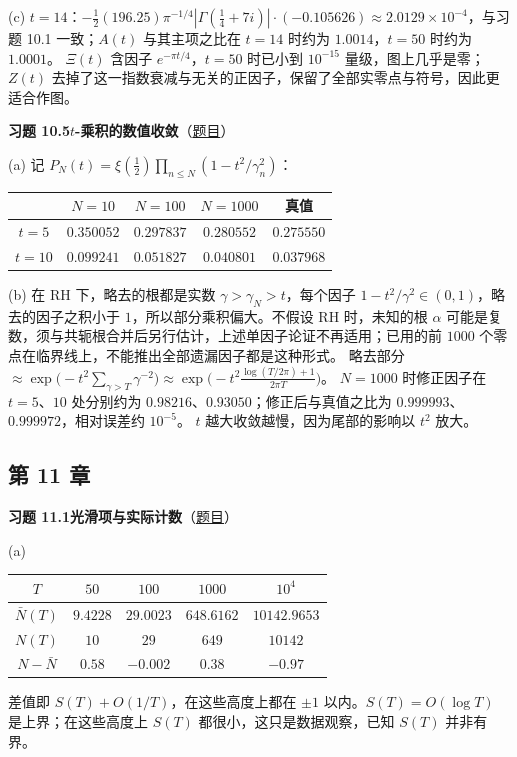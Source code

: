 \documentclass[11pt,a4paper]{article}
\newcommand{\Sol}[2]{%
  \par\addvspace{1.2em}\noindent
  \hypertarget{s:#1}{}\textbf{习题 #1\quad #2}\hfill{\small（\hyperlink{q:#1}{题目}）}\par
  \nopagebreak\smallskip}
\begin{document}
(c) $t=14$：$-\frac12(196.25)\pi^{-1/4}|\Gamma(\frac14+7i)|\cdot(-0.105626)\approx2.0129\times10^{-4}$，与习题 10.1 一致；$A(t)$ 与其主项之比在 $t=14$ 时约为 $1.0014$，$t=50$ 时约为 $1.0001$。
$\Xi(t)$ 含因子 $e^{-\pi t/4}$，$t=50$ 时已小到 $10^{-15}$ 量级，图上几乎是零；$Z(t)$ 去掉了这一指数衰减与无关的正因子，保留了全部实零点与符号，因此更适合作图。

\Sol{10.5}{$t$-乘积的数值收敛}
(a) 记 $P_N(t)=\xi(\frac12)\prod_{n\le N}(1-t^2/\gamma_n^2)$：
\begin{center}
\small
\begin{tabular}{@{}ccccc@{}}
\toprule
 & $N=10$ & $N=100$ & $N=1000$ & 真值 \\
\midrule
$t=5$ & $0.350052$ & $0.297837$ & $0.280552$ & $0.275550$ \\
$t=10$ & $0.099241$ & $0.051827$ & $0.040801$ & $0.037968$ \\
\bottomrule
\end{tabular}
\end{center}

(b) 在 RH 下，略去的根都是实数 $\gamma>\gamma_N>t$，每个因子 $1-t^2/\gamma^2\in(0,1)$，略去的因子之积小于 $1$，所以部分乘积偏大。不假设 RH 时，未知的根 $\alpha$ 可能是复数，须与共轭根合并后另行估计，上述单因子论证不再适用；已用的前 $1000$ 个零点在临界线上，不能推出全部遗漏因子都是这种形式。
略去部分 $\approx\exp\bigl(-t^2\sum_{\gamma>T}\gamma^{-2}\bigr)\approx\exp\bigl(-t^2\frac{\log(T/2\pi)+1}{2\pi T}\bigr)$。
$N=1000$ 时修正因子在 $t=5$、$10$ 处分别约为 $0.98216$、$0.93050$；修正后与真值之比为 $0.999993$、$0.999972$，相对误差约 $10^{-5}$。
$t$ 越大收敛越慢，因为尾部的影响以 $t^2$ 放大。

\subsection*{第 11 章}

\Sol{11.1}{光滑项与实际计数}
(a)
\begin{center}
\small
\begin{tabular}{@{}ccccc@{}}
\toprule
$T$ & $50$ & $100$ & $1000$ & $10^4$ \\
\midrule
$\bar N(T)$ & $9.4228$ & $29.0023$ & $648.6162$ & $10142.9653$ \\
$N(T)$ & $10$ & $29$ & $649$ & $10142$ \\
$N-\bar N$ & $0.58$ & $-0.002$ & $0.38$ & $-0.97$ \\
\bottomrule
\end{tabular}
\end{center}
差值即 $S(T)+O(1/T)$，在这些高度上都在 $\pm1$ 以内。$S(T)=O(\log T)$ 是上界；在这些高度上 $S(T)$ 都很小，这只是数据观察，已知 $S(T)$ 并非有界。
\end{document}

